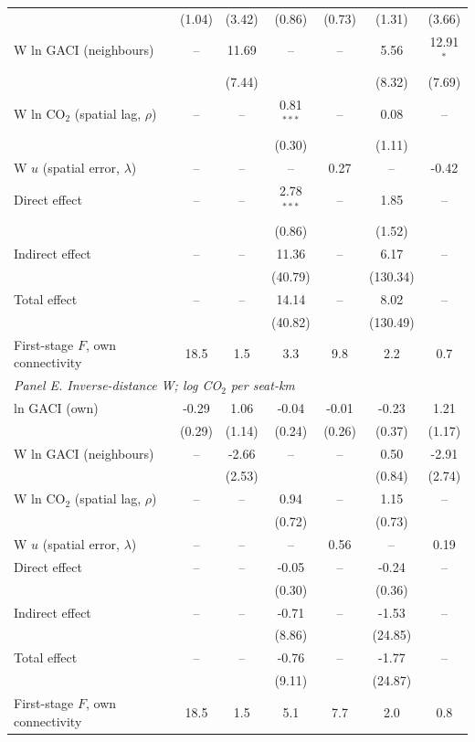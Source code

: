 \documentclass[12pt]{extarticle}
\begin{document}
\begin{table}[H]
{\begin{threeparttable}
\begin{tabular}{lcccccc}
   & (1.04) & (3.42) & (0.86) & (0.73) & (1.31) & (3.66) \\
  W ln GACI (neighbours) & -- & 11.69 & -- & -- & 5.56 & 12.91$^{*}$ \\
   &  & (7.44) &  &  & (8.32) & (7.69) \\
  W ln CO$_2$ (spatial lag, $\rho$) & -- & -- & 0.81$^{***}$ & -- & 0.08 & -- \\
   &  &  & (0.30) &  & (1.11) &  \\
  W $u$ (spatial error, $\lambda$) & -- & -- & -- & 0.27 & -- & -0.42 \\
  Direct effect & -- & -- & 2.78$^{***}$ & -- & 1.85 & -- \\
   &  &  & (0.86) &  & (1.52) &  \\
  Indirect effect & -- & -- & 11.36 & -- & 6.17 & -- \\
   &  &  & (40.79) &  & (130.34) &  \\
  Total effect & -- & -- & 14.14 & -- & 8.02 & -- \\
   &  &  & (40.82) &  & (130.49) &  \\
  First-stage $F$, own connectivity & 18.5 & 1.5 & 3.3 & 9.8 & 2.2 & 0.7 \\
\midrule
\multicolumn{7}{l}{\textit{Panel E. Inverse-distance W; log CO$_2$ per seat-km}} \\
  ln GACI (own) & -0.29 & 1.06 & -0.04 & -0.01 & -0.23 & 1.21 \\
   & (0.29) & (1.14) & (0.24) & (0.26) & (0.37) & (1.17) \\
  W ln GACI (neighbours) & -- & -2.66 & -- & -- & 0.50 & -2.91 \\
   &  & (2.53) &  &  & (0.84) & (2.74) \\
  W ln CO$_2$ (spatial lag, $\rho$) & -- & -- & 0.94 & -- & 1.15 & -- \\
   &  &  & (0.72) &  & (0.73) &  \\
  W $u$ (spatial error, $\lambda$) & -- & -- & -- & 0.56 & -- & 0.19 \\
  Direct effect & -- & -- & -0.05 & -- & -0.24 & -- \\
   &  &  & (0.30) &  & (0.36) &  \\
  Indirect effect & -- & -- & -0.71 & -- & -1.53 & -- \\
   &  &  & (8.86) &  & (24.85) &  \\
  Total effect & -- & -- & -0.76 & -- & -1.77 & -- \\
   &  &  & (9.11) &  & (24.87) &  \\
  First-stage $F$, own connectivity & 18.5 & 1.5 & 5.1 & 7.7 & 2.0 & 0.8 \\

\end{tabular}
\end{threeparttable}}
\end{table}
\end{document}
